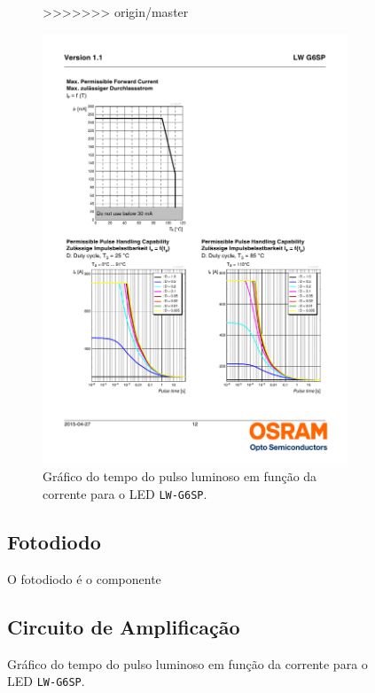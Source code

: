\begin{table}[h!]
\begin{figure}[htb]
	\begin{figure}[h!]
>>>>>>> origin/master
		\caption{\label{fig_ledpulse} Gráfico do tempo do pulso luminoso em função da corrente para o LED \texttt{LW-G6SP}.}
		\centering
		\includegraphics[width=0.3\textheight, trim={2.1cm 4.9cm 10.6cm 15.7cm}, clip]{lw-g6sp-pulse.pdf}
	\end{figure}
	
	\subsection{Fotodiodo}\label{hard-photodiode}
	
	O fotodiodo é o componente 
	
	
	\subsection{Circuito de Amplificação}\label{hard-opamp}
	

\end{figure}
\end{table}
